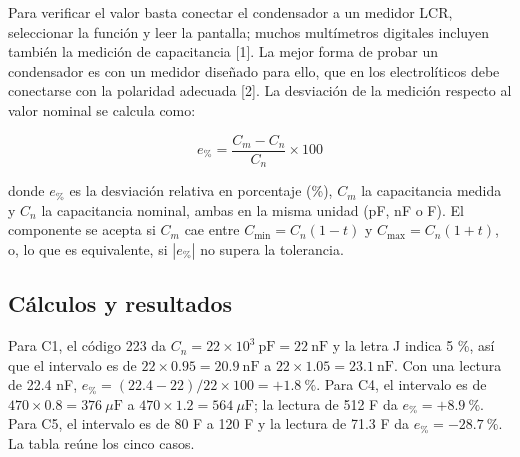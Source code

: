 \documentclass[11pt,letterpaper]{article}
\begin{document}
Para verificar el valor basta conectar el condensador a un medidor LCR, seleccionar la función y leer la pantalla; muchos multímetros digitales incluyen también la medición de capacitancia [1]. La mejor forma de probar un condensador es con un medidor diseñado para ello, que en los electrolíticos debe conectarse con la polaridad adecuada [2]. La desviación de la medición respecto al valor nominal se calcula como:

\begin{equation}
  e_{\text{\%}} = \frac{C_{m} - C_{n}}{C_{n}} \times 100
\end{equation}

donde $e_{\text{\%}}$ es la desviación relativa en porcentaje (\%), $C_m$ la capacitancia medida y $C_n$ la capacitancia nominal, ambas en la misma unidad (pF, nF o \textmu{}F). El componente se acepta si $C_m$ cae entre $C_{\min} = C_n(1-t)$ y $C_{\max} = C_n(1+t)$, o, lo que es equivalente, si $|e_{\text{\%}}|$ no supera la tolerancia.

\subsection{Cálculos y resultados}

Para C1, el código 223 da $C_n = 22 \times 10^3\ \text{pF} = 22\ \text{nF}$ y la letra J indica \textpm{}5 \%, así que el intervalo es de $22 \times 0.95 = 20.9\ \text{nF}$ a $22 \times 1.05 = 23.1\ \text{nF}$. Con una lectura de 22.4 nF, $e_{\text{\%}} = (22.4 - 22)/22 \times 100 = +1.8\ \text{\%}$. Para C4, el intervalo es de $470 \times 0.8 = 376\ \mu\text{F}$ a $470 \times 1.2 = 564\ \mu\text{F}$; la lectura de 512 \textmu{}F da $e_{\text{\%}} = +8.9\ \text{\%}$. Para C5, el intervalo es de 80 \textmu{}F a 120 \textmu{}F y la lectura de 71.3 \textmu{}F da $e_{\text{\%}} = -28.7\ \text{\%}$. La tabla reúne los cinco casos.
\end{document}
